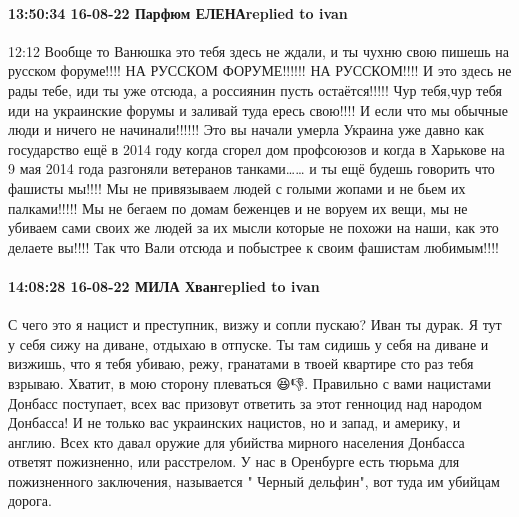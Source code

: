  
 
 
 
 

\paragraph{13:50:34 16-08-22 Парфюм ЕЛЕНАreplied to ivan}

12:12
Вообще то Ванюшка это тебя здесь не ждали, и ты чухню свою пишешь на русском
форуме!!!! НА РУССКОМ ФОРУМЕ!!!!!! НА РУССКОМ!!!! И это здесь не рады тебе, иди
ты уже отсюда, а россиянин пусть остаётся!!!!! Чур тебя,чур тебя иди на
украинские форумы и заливай туда ересь свою!!!! И если что мы обычные люди и
ничего не начинали!!!!!! Это вы начали умерла Украина уже давно как государство
ещё в 2014 году когда сгорел дом профсоюзов и когда в Харькове на 9 мая 2014
года разгоняли ветеранов танками…… и ты ещё будешь говорить что фашисты мы!!!!
Мы не привязываем людей с голыми жопами и не бьем их палками!!!!! Мы не бегаем
по домам беженцев и не воруем их вещи, мы не убиваем сами своих же людей за их
мысли которые не похожи на наши, как это делаете вы!!!! Так что Вали отсюда и
побыстрее к своим фашистам любимым!!!!

\paragraph{14:08:28 16-08-22 МИЛА Хванreplied to ivan}

С чего это я нацист и преступник, визжу и сопли пускаю? Иван ты дурак. Я тут у
себя сижу на диване, отдыхаю в отпуске. Ты там сидишь у себя на диване и
визжишь, что я тебя убиваю, режу, гранатами в твоей квартире сто раз тебя
взрываю. Хватит, в мою сторону плеваться 😆👎. Правильно с вами нацистами
Донбасс поступает, всех вас призовут ответить за этот генноцид над народом
Донбасса! И не только вас украинских нацистов, но и запад, и америку, и англию.
Всех кто давал оружие для убийства мирного населения Донбасса ответят
пожизненно, или расстрелом. У нас в Оренбурге есть тюрьма для пожизненного
заключения, называется " Черный дельфин", вот туда им убийцам дорога.


